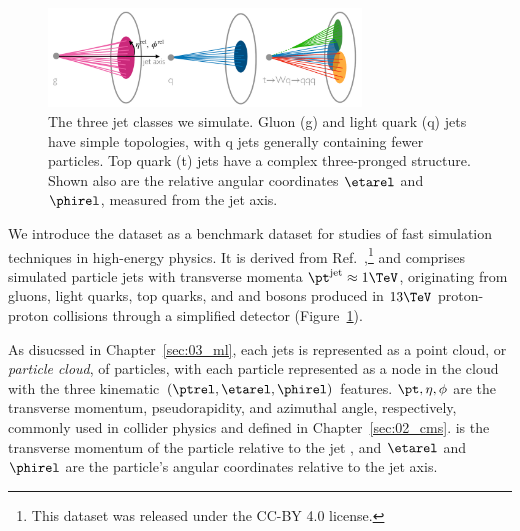 \section{\texorpdfstring{\jetnet}{JetNet}}
\label{sec:04_jetnet_dataset}

\begin{figure}[t!]
    \centering
    \includegraphics[width=0.74\textwidth]{figures/04-ML4Sim/jets/jetcartoon.pdf}
    \caption[The three jet classes we simulate.]{
    The three jet classes we simulate. 
    Gluon (g) and light quark (q) jets have simple topologies, with q jets generally containing fewer particles. 
    Top quark (t) jets have a complex three-pronged structure.
    Shown also are the relative angular coordinates $\etarel$ and $\phirel$, measured from the jet axis.}
    \label{fig:04_jetcartoon}
\end{figure}

We introduce the \jetnet dataset as a benchmark dataset for studies of fast simulation techniques in high-energy physics.
It is derived from Ref.~\cite{hls4mldata_150p},\footnote{This dataset was released under the CC-BY 4.0 license.} and comprises simulated particle jets with transverse momenta $\pt^{\mathrm{jet}}\approx 1\TeV$, originating from gluons, light quarks, top quarks, and \PW and \PZ bosons produced in $13\TeV$ proton-proton collisions through a simplified detector (Figure~\ref{fig:04_jetcartoon}).

As disucssed in Chapter~\ref{sec:03_ml}, each jets is represented as a point cloud, or \textit{particle cloud}, of particles, with each particle represented as a node in the cloud with the three kinematic $(\ptrel, \etarel, \phirel)$ features.
$\pt, \eta, \phi$ are the transverse momentum, pseudorapidity, and azimuthal angle, respectively, commonly used in collider physics and defined in Chapter~\ref{sec:02_cms}.
\ptrel is the transverse momentum of the particle relative to the jet \pt, and $\etarel$ and $\phirel$ are the particle's angular coordinates relative to the jet axis.

